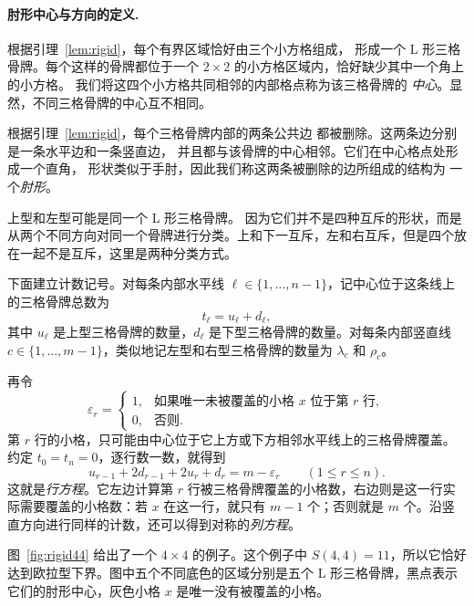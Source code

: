 \documentclass[11pt]{ctexart}
\renewenvironment{quote}{\begin{markdownquote}}{\end{markdownquote}}
\theoremstyle{definition}
\begin{document}
\paragraph{肘形中心与方向的定义.}
根据引理~\ref{lem:rigid}，每个有界区域恰好由三个小方格组成，
形成一个 L 形三格骨牌。每个这样的骨牌都位于一个 $2\times2$
的小方格区域内，恰好缺少其中一个角上的小方格。
我们将这四个小方格共同相邻的内部格点称为该三格骨牌的
\emph{中心}。显然，不同三格骨牌的中心互不相同。

根据引理~\ref{lem:rigid}，每个三格骨牌内部的两条公共边
都被删除。这两条边分别是一条水平边和一条竖直边，
并且都与该骨牌的中心相邻。它们在中心格点处形成一个直角，
形状类似于手肘，因此我们称这两条被删除的边所组成的结构为
一个\emph{肘形}。

\begin{quote}
    上型和左型可能是同一个 L 形三格骨牌。 因为它们并不是四种互斥的形状，而是从两个不同方向对同一个骨牌进行分类。上和下一互斥，左和右互斥，但是四个放在一起不是互斥，这里是两种分类方式。
\end{quote}

下面建立计数记号。对每条内部水平线 $\ell\in\{1,\ldots,n-1\}$，记中心位于这条线上的三格骨牌总数为
\[
t_\ell=u_\ell+d_\ell,
\]
其中 $u_\ell$ 是上型三格骨牌的数量，$d_\ell$ 是下型三格骨牌的数量。对每条内部竖直线 $c\in\{1,\ldots,m-1\}$，类似地记左型和右型三格骨牌的数量为 $\lambda_c$ 和 $\rho_c$。

再令
\[
\varepsilon_r=
\begin{cases}
1,&\text{如果唯一未被覆盖的小格 }x\text{ 位于第 }r\text{ 行},\\
0,&\text{否则}.
\end{cases}
\]
第 $r$ 行的小格，只可能由中心位于它上方或下方相邻水平线上的三格骨牌覆盖。约定 $t_0=t_n=0$，逐行数一数，就得到
\begin{equation}\label{eq:row}
u_{r-1}+2d_{r-1}+2u_r+d_r
=m-\varepsilon_r
\qquad(1\le r\le n).
\end{equation}
这就是\emph{行方程}。它左边计算第 $r$ 行被三格骨牌覆盖的小格数，右边则是这一行实际需要覆盖的小格数：若 $x$ 在这一行，就只有 $m-1$ 个；否则就是 $m$ 个。沿竖直方向进行同样的计数，还可以得到对称的\emph{列方程}。

图~\ref{fig:rigid44} 给出了一个 $4\times4$ 的例子。这个例子中 $S(4,4)=11$，所以它恰好达到欧拉型下界。图中五个不同底色的区域分别是五个 L 形三格骨牌，黑点表示它们的肘形中心，灰色小格 $x$ 是唯一没有被覆盖的小格。
\end{document}
